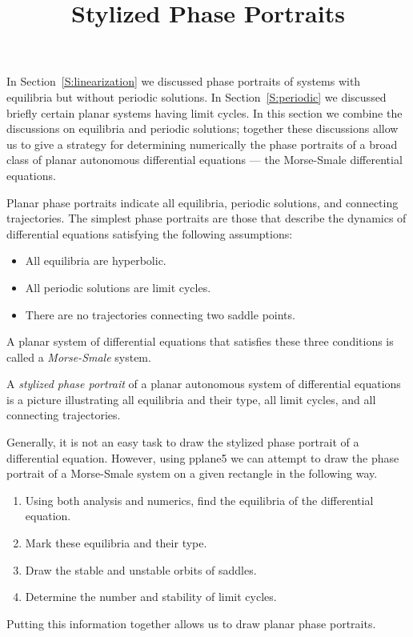 \documentclass{ximera}
\title{Stylized Phase Portraits}
\begin{document}
\begin{abstract}
\end{abstract}
\maketitle

  \label{S:SPP}


In Section~\ref{S:linearization} we discussed phase portraits of systems with 
equilibria but without periodic solutions.  In Section~\ref{S:periodic} we 
discussed briefly certain planar systems having limit cycles.  In this 
section we combine the discussions on equilibria and periodic solutions; 
together these discussions allow us to give a strategy for determining 
numerically the phase portraits of a broad class of planar autonomous 
differential equations --- the Morse-Smale differential equations.
 
Planar phase portraits indicate all equilibria, periodic
solutions, and connecting trajectories.  The simplest phase
portraits are those that describe the dynamics of differential
equations satisfying the following assumptions: 
\begin{itemize}
\item	All equilibria are hyperbolic.
\item	All periodic solutions are limit cycles.
\item	There are no trajectories connecting two saddle points.
\end{itemize}
A planar system of differential equations that satisfies these
three conditions is called a {\em Morse-Smale\/} system.  

\begin{Def} \label{D:stylized}
A {\em stylized phase portrait\/} of a planar autonomous system
of differential equations is a picture illustrating all
equilibria and their type, all limit cycles, and all connecting
trajectories.
\end{Def}

Generally, it is not an easy task to draw the stylized phase
portrait of a differential equation.  However, using {\sf pplane5\/} 
we can attempt to draw the phase portrait of a
Morse-Smale system on a given rectangle in the following way.
\begin{enumerate}
\item Using both analysis and numerics, find the equilibria of
the differential equation.
\item Mark these equilibria and their type.  
\item Draw the stable and unstable orbits of saddles.  
\item Determine the number and stability of limit cycles.  
\end{enumerate}
Putting this information together allows us to draw planar phase
portraits.
\end{document}

